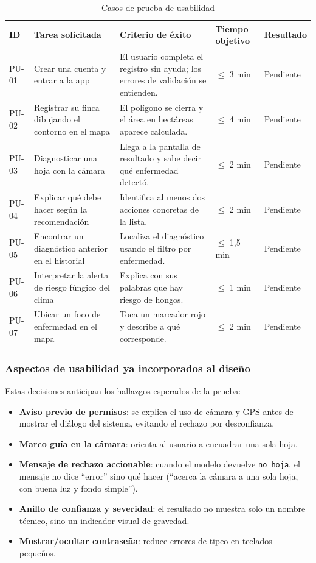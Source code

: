 \documentclass[12pt,a4paper]{article}
\begin{document}
\begin{table}[H]
\centering
\caption{Casos de prueba de usabilidad}
\label{tab:pu}
\renewcommand{\arraystretch}{1.3}
\small
\begin{tabular}{p{1.1cm} p{4.0cm} p{4.6cm} p{1.7cm} p{1.6cm}}
\toprule
\bfseries ID & \bfseries Tarea solicitada & \bfseries Criterio de éxito & \bfseries Tiempo objetivo & \bfseries Resultado \\
\midrule
PU-01 & Crear una cuenta y entrar a la app & El usuario completa el registro sin ayuda; los errores de validación se entienden. & $\leq$ 3 min & Pendiente \\
PU-02 & Registrar su finca dibujando el contorno en el mapa & El polígono se cierra y el área en hectáreas aparece calculada. & $\leq$ 4 min & Pendiente \\
PU-03 & Diagnosticar una hoja con la cámara & Llega a la pantalla de resultado y sabe decir qué enfermedad detectó. & $\leq$ 2 min & Pendiente \\
PU-04 & Explicar qué debe hacer según la recomendación & Identifica al menos dos acciones concretas de la lista. & $\leq$ 2 min & Pendiente \\
PU-05 & Encontrar un diagnóstico anterior en el historial & Localiza el diagnóstico usando el filtro por enfermedad. & $\leq$ 1{,}5 min & Pendiente \\
PU-06 & Interpretar la alerta de riesgo fúngico del clima & Explica con sus palabras que hay riesgo de hongos. & $\leq$ 1 min & Pendiente \\
PU-07 & Ubicar un foco de enfermedad en el mapa & Toca un marcador rojo y describe a qué corresponde. & $\leq$ 2 min & Pendiente \\
\bottomrule
\end{tabular}
\end{table}

\subsubsection{Aspectos de usabilidad ya incorporados al diseño}

Estas decisiones anticipan los hallazgos esperados de la prueba:

\begin{itemize}
  \item \textbf{Aviso previo de permisos}: se explica el uso de cámara y GPS
        antes de mostrar el diálogo del sistema, evitando el rechazo por
        desconfianza.
  \item \textbf{Marco guía en la cámara}: orienta al usuario a encuadrar una sola
        hoja.
  \item \textbf{Mensaje de rechazo accionable}: cuando el modelo devuelve
        \texttt{no\_hoja}, el mensaje no dice ``error'' sino qué hacer
        (``acerca la cámara a una sola hoja, con buena luz y fondo simple'').
  \item \textbf{Anillo de confianza y severidad}: el resultado no muestra solo un
        nombre técnico, sino un indicador visual de gravedad.
  \item \textbf{Mostrar/ocultar contraseña}: reduce errores de tipeo en teclados
        pequeños.
\end{itemize}
\end{document}
